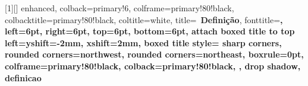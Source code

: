 \usepackage{enumitem}       %

\usepackage[nameinlink,noabbrev]{cleveref}

\usepackage{listings}
\lstset{style=code}

\usepackage[most]{tcolorbox}
\usepackage{fontawesome5}


\newcommand{\MakeBoxEnv}[4]{%
  \newtcolorbox{#1}[1][]{
    enhanced,
    colback=#3!6,                   %
    colframe=#3!80!black,           %
    colbacktitle=#3!80!black,       %
    coltitle=white,                 %
    title={#4\ \textbf{#2}},        %
    fonttitle=\bfseries\sffamily,   %
    left=6pt, right=6pt, top=6pt, bottom=6pt,
    attach boxed title to top left={yshift=-2mm, xshift=2mm},
    boxed title style={
      sharp corners,
      rounded corners=northwest,
      rounded corners=northeast,
      boxrule=0pt,
      colframe=#3!80!black,
      colback=#3!80!black,
    },
    drop shadow,                    %
    #1                              %
  }%
}

\MakeBoxEnv{definicao}{Definição}{primary}{\faBook}

